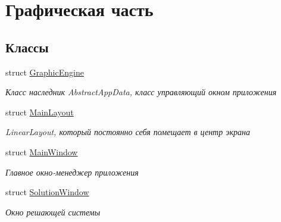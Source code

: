 \hypertarget{group___u_i}{
\section{Графическая часть}
\label{group___u_i}
}
\subsection*{Классы}
\begin{DoxyCompactItemize}
\item 
struct \hyperlink{struct_graphic_engine}{GraphicEngine}
\begin{DoxyCompactList}\small\item\em Класс наследник AbstractAppData, класс управляющий окном приложения \item\end{DoxyCompactList}\item 
struct \hyperlink{struct_main_layout}{MainLayout}
\begin{DoxyCompactList}\small\item\em LinearLayout, который постоянно себя помещает в центр экрана \item\end{DoxyCompactList}\item 
struct \hyperlink{struct_main_window}{MainWindow}
\begin{DoxyCompactList}\small\item\em Главное окно-\/менеджер приложения \item\end{DoxyCompactList}\item 
struct \hyperlink{struct_solution_window}{SolutionWindow}
\begin{DoxyCompactList}\small\item\em Окно решающей системы \item\end{DoxyCompactList}\end{DoxyCompactItemize}
